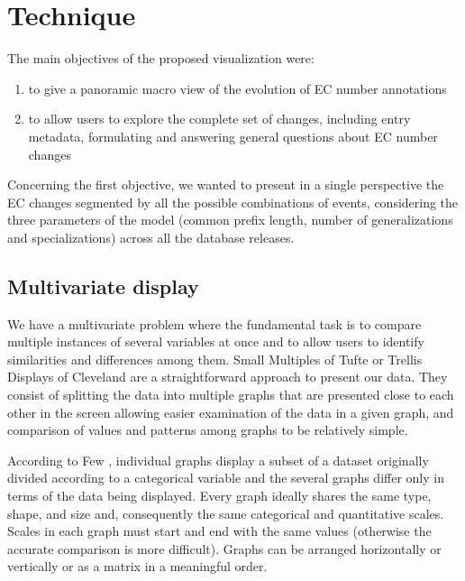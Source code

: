 \section{Technique}
\label{sec:technique}

The main objectives of the proposed visualization were:

\begin{enumerate}
\item to give a panoramic macro view of the evolution of EC number annotations
\item to allow users to explore the complete set of changes, including entry metadata, formulating and answering general questions about EC number changes
\end{enumerate}

Concerning the first objective, we wanted to present in a single perspective the EC changes segmented by all the possible combinations of events, considering the three parameters of the model (common prefix length, number of generalizations and specializations) across all the database releases.

\subsection{Multivariate display}

We have a multivariate problem where the fundamental task is to compare multiple instances of several variables at once and to allow users to identify similarities and differences among them. Small Multiples of Tufte  \cite{tufte_envisioning} or Trellis Displays of Cleveland \cite{cleveland_trellis1,cleveland_trellis2} are a straightforward approach to present our data. They consist of splitting the data into multiple graphs that are presented close to each other in the screen allowing easier examination of the data in a given graph, and comparison of values and patterns among graphs to be relatively simple.
 
According to Few \cite{few_nysi}, individual graphs display a subset of a dataset originally divided according to a categorical variable and the several graphs differ only in terms of the data being displayed. Every graph ideally shares the same type, shape, and size and, consequently the same categorical and quantitative scales. Scales in each graph must start and end with the same values (otherwise the accurate comparison is more difficult). Graphs can be arranged horizontally or vertically or as a matrix in a meaningful order. 

